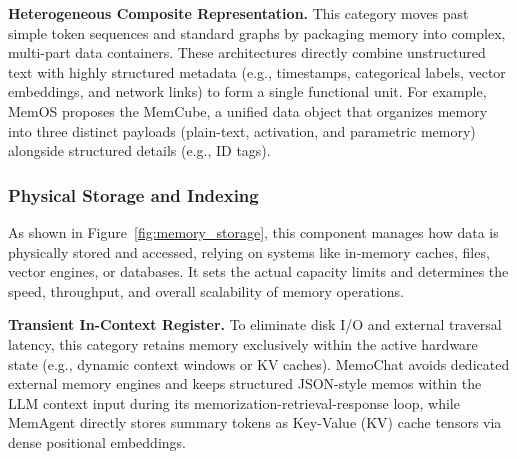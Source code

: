 \documentclass{llmxive}
\begin{document}

\noindent  \textbf{Heterogeneous Composite Representation.}
This category moves past simple token sequences and standard graphs by packaging memory into complex, multi-part data containers. These architectures directly combine unstructured text with highly structured metadata (e.g., timestamps, categorical labels, vector embeddings, and network links) to form a single functional unit. For example, MemOS proposes the MemCube, a unified data object that organizes memory into three distinct payloads (plain-text, activation, and parametric memory) alongside structured details (e.g., ID tags).




\subsubsection{\textbf{Physical Storage and Indexing}}
As shown in Figure~\ref{fig:memory_storage}, this component manages how data is physically stored and accessed, relying on systems like in-memory caches, files, vector engines, or databases.
It sets the actual capacity limits and determines the speed, throughput, and overall scalability of memory operations.

\noindent  \textbf{Transient In-Context Register.}
To eliminate disk I/O and external traversal latency, this category retains memory exclusively within the active hardware state (e.g., dynamic context windows or KV caches).
MemoChat avoids dedicated external memory engines and keeps structured JSON-style memos within the LLM context input during its memorization-retrieval-response loop, while MemAgent directly stores summary tokens as Key-Value (KV) cache tensors via dense positional embeddings.
\end{document}

